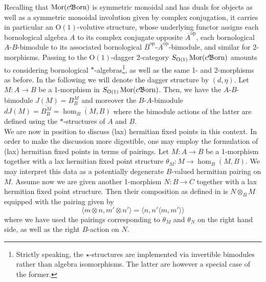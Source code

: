 \documentclass{article}
\newcommand{\opp}{\operatorname{op}}%
\newcommand{\Mor}{\operatorname{Mor}}%
\newcommand{\cBorn}{c\mathfrak{B}\hspace{-0.05cm}\operatorname{orn}}%
\newcommand{\Oone}{\operatorname{O(1)}}
\numberwithin{equation}{section}
\theoremstyle{definition}
\theoremstyle{theorem}
\begin{document}
Recalling that $\Mor(\cBorn)$ is symmetric monoidal and has duals for objects as well as a symmetric monoidal involution given by complex conjugation, it carries 
in particular an $\Oone$-volutive structure, whose underlying functor assigns each bornological algebra $A$ to its complex conjugate opposite $\overline{A}^{\opp}$, each 
bornological $A$-$B$-bimodule to its associated bornological $\overline{B}^{\opp}$-$\overline{A}^{\opp}$-bimodule, 
and similar for 2-morphisms. Passing to the $\Oone$-dagger 2-category $S_{\Oone}\Mor(\cBorn)$ amounts to considering bornological $*$-algebras\footnote{Strictly 
speaking, the $\star$-structures are implemented via invertible bimodules rather than algebra isomorphisms. The latter are however a special case of the former.}, 
as well as the same 1- and 2-morphisms as before. In the following we will denote the dagger structure by $(d,\eta)$. Let $M \colon A \to B$ be a 1-morphism in 
$S_{\Oone}\Mor(\cBorn)$.
Then, we have the $A$-$B$-bimodule $J(M) = B^M_B$ and moreover the $B$-$A$-bimodule $dJ(M) = \overline{B^M_B} = \overline{\hom_B(M,B)}$ where the bimodule actions of the latter are 
defined using the $*$-structures of $A$ and $B$. \\
We are now in position to discuss (lax) hermitian fixed points in this context. In order to make the discussion more digestible, one may employ the 
formulation of (lax) hermitian fixed points in terms of pairings. Let $M \colon A \to B$ be a 1-morphism together with a lax hermitian fixed point structure 
$\theta_M \colon M \to \overline{\hom_B(M,B)}$. We may interpret this data as a potentially degenerate $B$-valued hermitian pairing on $M$. Assume now we are given another 
1-morphism $N \colon B \to C$ together with a lax hermitian fixed point structure. Then their composition as defined in 
 is $N \otimes_B M$ equipped with the pairing given by
\begin{equation}\label{Equation: pretensorproduct of hilbert modules}
    \langle m \otimes n, m' \otimes n' \rangle = \langle n, n'\langle m,m' \rangle \rangle
\end{equation}
where we have used the pairings corresponding to $\theta_M$ and $\theta_N$ on the right hand side, as well 
as the right $B$-action on $N$.\\
\end{document}
